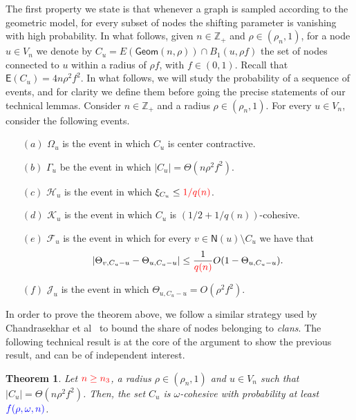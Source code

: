 \documentclass[letterpaper,11pt]{article}
\newcommand{\calH}{\mathcal{H}}
\newcommand{\calF}{\mathcal{F}}
\newcommand{\ZZ}{\mathbb{Z}}
\newcommand{\EE}{\mathsf{E}}
\newcommand{\nsf}{\mathsf{N}}
\newcommand{\poi}{\mathsf{Geom}}
\newtheorem{theorem}{Theorem}
\begin{document}
The first property we state is that whenever a graph is sampled according to the geometric model, for every subset of nodes the shifting parameter is vanishing with high probability.
In what follows, given $n\in \ZZ_+$ and $\rho\in (\rho_n,1)$, for a node $u\in V_n$ we denote by $C_u=E(\poi(n,\rho))\cap B_1(u,\rho f)$ the set of nodes connected to $u$ within a radius of $\rho f$, with $f\in (0,1)$.
Recall that $\EE(C_u)=4n\rho^2f^2$.
In what follows, we will study the probability of a sequence of events, and for clarity we define them before going the precise statements of our technical lemmas.
Consider $n\in \ZZ_+$ and a radius $\rho\in (\rho_n,1)$. 
For every $u\in V_n$, consider the following events.
\begin{itemize}
	\item[$(a)$]  $\Omega_u$ is the event in which $C_u$ is center contractive.
	\item[$(b)$] $\Gamma_u$ be the event in which $|C_u|=\Theta(n\rho^2f^2)$.
	\item[$(c)$] $\calH_u$ is the event in which $\xi_{C_u}\le {\color{red}1/q(n)}$.
	\item[$(d)$] $\mathcal{K}_u$ is the event in which $C_u$ is $(1/2+1/q(n))$-cohesive.
	\item[$(e)$] $\calF_u$ is the event in which for every $v\in \nsf(u)\setminus C_u$ we have that 
	\begin{equation*}
	|\Theta_{v,C_u-u}-\Theta_{u,C_u-u}|\le \frac{1}{{\color{red}q(n)}}O(1-\Theta_{u,C_u-u}).
	\end{equation*}
	\item[$(f)$] $\mathcal{J}_u$ is the event in which $\Theta_{u,C_u-u}=O(\rho^2f^2)$.
\end{itemize}


In order to prove the theorem above, we follow a similar strategy used by Chandrasekhar et al~\cite{} to bound the share of nodes belonging to {\it clans}.
The following technical result is at the core of the argument to show the previous result, and can be of independent interest.

\begin{theorem}
\label{thm:cohesive}
Let $\color{red} n\ge n_3$, a radius $\rho\in (\rho_n,1)$ and $u\in V_n$ such that $|C_u|=\Theta(n\rho^2f^2)$.
Then, the set $C_u$ is $\omega$-cohesive with probability at least $\color{blue} f(\rho,\omega,n)$.
\end{theorem}
\end{document}
